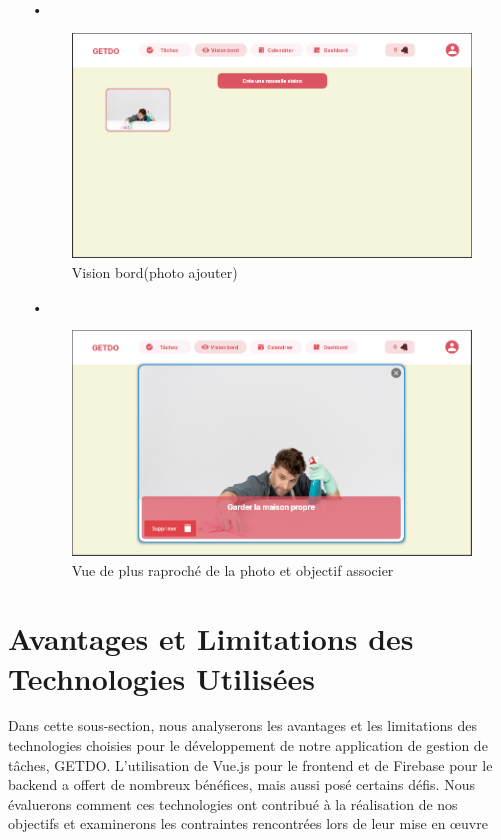 \documentclass[a4paper,12pt]{report}
\begin{document}
\begin{itemize}
      
      \item[•]\begin{figure}[h!]
          \includegraphics[width=1\textwidth]{./images/getdo_screenshot/getdo_vision.png}
          \caption{Vision bord(photo ajouter)}
          \label{fig:jira_project_task}
        \end{figure}
         
      \item[•]\begin{figure}[h!]
          \includegraphics[width=1\textwidth]{./images/getdo_screenshot/getdo_vision_close.png}
          \caption{Vue de plus raproché de la photo et objectif associer}
          \label{fig:jira_project_task}
        \end{figure}
    \end{itemize}
    
  \section{Avantages et Limitations des Technologies Utilisées}
  Dans cette sous-section, nous analyserons les avantages et les limitations des technologies choisies pour le développement de notre application de gestion de tâches, GETDO. L'utilisation de Vue.js pour le frontend et de Firebase pour le backend a offert de nombreux bénéfices, mais aussi posé certains défis. Nous évaluerons comment ces technologies ont contribué à la réalisation de nos objectifs et examinerons les contraintes rencontrées lors de leur mise en œuvre
\end{document}
